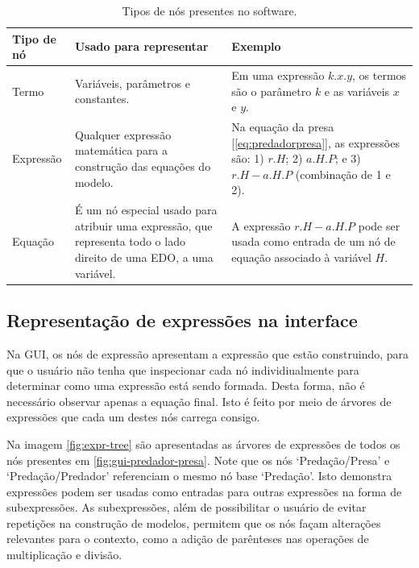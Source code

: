 \documentclass[
	12pt,				%
	openright,			%
	oneside,			%
	a4paper,			%
	main=brazil,
	english,			%
	]{ufsj-abntex2}
\begin{document}
\begin{table}
\begin{center}
\begin{tabular}{ |m{}|m{}|m{}| }
    \hline
    \rowcolor{lightgray} Tipo de nó & Usado para representar & Exemplo \\
    \hline
    Termo & Variáveis, parâmetros e constantes. & Em uma expressão \(k.x.y\), os termos são o parâmetro $k$ e as variáveis $x$ e $y$. \\
    \hline
    Expressão & Qualquer expressão matemática para a construção das equações do modelo. & Na equação da presa [\ref{eq:predadorpresa}], as expressões são: 1) \(r.H\); 2) \(a.H.P\); e 3) \(r.H - a.H.P\) (combinação de 1 e 2). \\
    \hline
    Equação & É um nó especial usado para atribuir uma expressão, que representa todo o lado direito de uma EDO, a uma variável. & A expressão \(r.H - a.H.P\) pode ser usada como entrada de um nó de equação associado à variável $H$. \\
    \hline 
\end{tabular}
\end{center}
\caption{Tipos de nós presentes no software.}
\label{tab:tipos-de-nos}
\end{table}

\subsection{Representação de expressões na interface}
\label{subsec:exprtree}

Na GUI, os nós de expressão apresentam a expressão que estão construindo, para que o usuário não tenha que inspecionar cada nó individiualmente para determinar como uma expressão está sendo formada. Desta forma, não é necessário observar apenas a equação final. Isto é feito por meio de árvores de expressões que cada um destes nós carrega consigo.

Na imagem \ref{fig:expr-tree} são apresentadas as árvores de expressões de todos os nós presentes em \ref{fig:gui-predador-presa}. Note que os nós `Predação/Presa' e `Predação/Predador' referenciam o mesmo nó base `Predação'. Isto demonstra expressões podem ser usadas como entradas para outras expressões na forma de subexpressões. As subexpressões, além de possibilitar o usuário de evitar repetições na construção de modelos, permitem que os nós façam alterações relevantes para o contexto, como a adição de parênteses nas operações de multiplicação e divisão.
\end{document}
